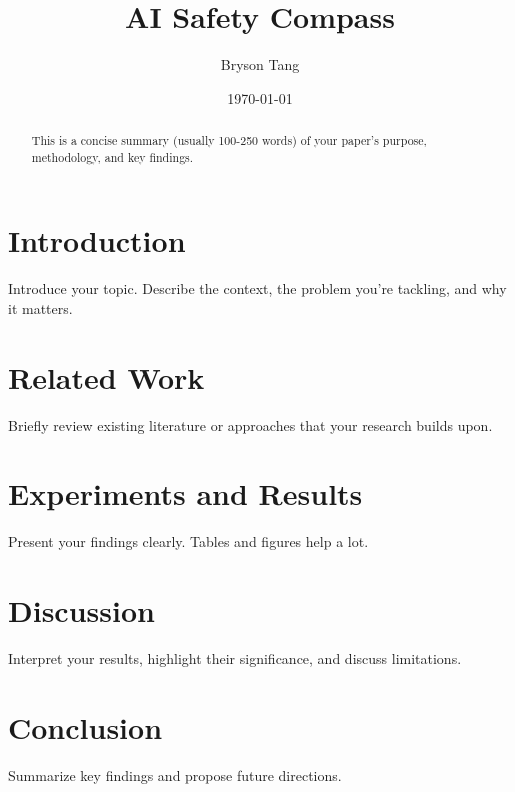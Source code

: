 \documentclass[11pt]{article}
\title{AI Safety Compass}
\author{Bryson Tang}
\date{\today}
\begin{document}
\maketitle

\begin{abstract}
This is a concise summary (usually 100-250 words) of your paper's purpose, methodology, and key findings.
\end{abstract}

\section{Introduction}
Introduce your topic. Describe the context, the problem you're tackling, and why it matters.

\section{Related Work}
Briefly review existing literature or approaches that your research builds upon.



\section{Experiments and Results}
Present your findings clearly. Tables and figures help a lot.

\section{Discussion}
Interpret your results, highlight their significance, and discuss limitations.

\section{Conclusion}
Summarize key findings and propose future directions.

% 
% 
\end{document}
